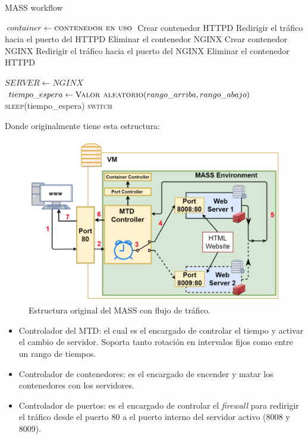 \begin{algorithm}
\caption{MASS workflow}\label{mass:algorithm}
    \begin{algorithmic}[1]
            \State $container \gets \textsc{contenedor en uso}$
                \State Crear contenedor HTTPD
                \State Redirigir el tráfico hacia el puerto del HTTPD
                \State Eliminar el contenedor NGINX
            \Else
                    \State Crear contenedor NGINX
                    \State Redirigir el tráfico hacia el puerto del NGINX
                    \State Eliminar el contenedor HTTPD
                \EndIf
            \EndIf
        \EndFunction

            \State $SERVER \gets NGINX$
                \State $tiempo\_espera \gets \textsc{Valor aleatorio}(rango\_arriba , rango\_abajo)$
                \State \textsc{sleep}(tiempo\_espera)
                \State \textsc{switch}
            \EndWhile
        \EndFunction
    \end{algorithmic}
\end{algorithm}

Donde originalmente tiene esta estructura:
\begin{figure}[H]
    \centering
    \includegraphics[width=\linewidth]{./imagenes/mass-structure.png}
    \caption{Estructura original del MASS con flujo de tráfico.\cite{MTD-DARE-DIM-MASS}}
\end{figure}

\begin{itemize}
    \item Controlador del MTD: el cual es el encargado de controlar el tiempo y activar el cambio de servidor. Soporta tanto rotación en intervalos fijos como entre un rango de tiempos.
    \item Controlador de contenedores: es el encargado de encender y matar los contenedores con los servidores.
    \item Controlador de puertos: es el encargado de controlar el \textit{firewall} para redirigir el tráfico desde el puerto 80 a el puerto interno del servidor activo (8008 y 8009). 
\end{itemize}

